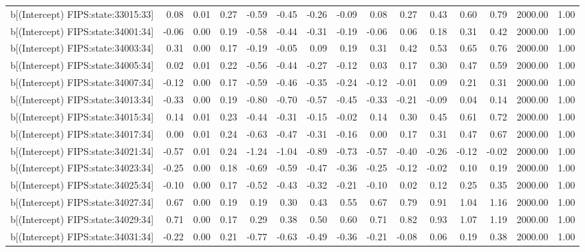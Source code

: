 \begin{table}[ht]
\begin{tabular}{rrrrrrrrrrrrrrr}
  b[(Intercept) FIPS:state:33015:33] & 0.08 & 0.01 & 0.27 & -0.59 & -0.45 & -0.26 & -0.09 & 0.08 & 0.27 & 0.43 & 0.60 & 0.79 & 2000.00 & 1.00 \\ 
  b[(Intercept) FIPS:state:34001:34] & -0.06 & 0.00 & 0.19 & -0.58 & -0.44 & -0.31 & -0.19 & -0.06 & 0.06 & 0.18 & 0.31 & 0.42 & 2000.00 & 1.00 \\ 
  b[(Intercept) FIPS:state:34003:34] & 0.31 & 0.00 & 0.17 & -0.19 & -0.05 & 0.09 & 0.19 & 0.31 & 0.42 & 0.53 & 0.65 & 0.76 & 2000.00 & 1.00 \\ 
  b[(Intercept) FIPS:state:34005:34] & 0.02 & 0.01 & 0.22 & -0.56 & -0.44 & -0.27 & -0.12 & 0.03 & 0.17 & 0.30 & 0.47 & 0.59 & 2000.00 & 1.00 \\ 
  b[(Intercept) FIPS:state:34007:34] & -0.12 & 0.00 & 0.17 & -0.59 & -0.46 & -0.35 & -0.24 & -0.12 & -0.01 & 0.09 & 0.21 & 0.31 & 2000.00 & 1.00 \\ 
  b[(Intercept) FIPS:state:34013:34] & -0.33 & 0.00 & 0.19 & -0.80 & -0.70 & -0.57 & -0.45 & -0.33 & -0.21 & -0.09 & 0.04 & 0.14 & 2000.00 & 1.00 \\ 
  b[(Intercept) FIPS:state:34015:34] & 0.14 & 0.01 & 0.23 & -0.44 & -0.31 & -0.15 & -0.02 & 0.14 & 0.30 & 0.45 & 0.61 & 0.72 & 2000.00 & 1.00 \\ 
  b[(Intercept) FIPS:state:34017:34] & 0.00 & 0.01 & 0.24 & -0.63 & -0.47 & -0.31 & -0.16 & 0.00 & 0.17 & 0.31 & 0.47 & 0.67 & 2000.00 & 1.00 \\ 
  b[(Intercept) FIPS:state:34021:34] & -0.57 & 0.01 & 0.24 & -1.24 & -1.04 & -0.89 & -0.73 & -0.57 & -0.40 & -0.26 & -0.12 & -0.02 & 2000.00 & 1.00 \\ 
  b[(Intercept) FIPS:state:34023:34] & -0.25 & 0.00 & 0.18 & -0.69 & -0.59 & -0.47 & -0.36 & -0.25 & -0.12 & -0.02 & 0.10 & 0.19 & 2000.00 & 1.00 \\ 
  b[(Intercept) FIPS:state:34025:34] & -0.10 & 0.00 & 0.17 & -0.52 & -0.43 & -0.32 & -0.21 & -0.10 & 0.02 & 0.12 & 0.25 & 0.35 & 2000.00 & 1.00 \\ 
  b[(Intercept) FIPS:state:34027:34] & 0.67 & 0.00 & 0.19 & 0.19 & 0.30 & 0.43 & 0.55 & 0.67 & 0.79 & 0.91 & 1.04 & 1.16 & 2000.00 & 1.00 \\ 
  b[(Intercept) FIPS:state:34029:34] & 0.71 & 0.00 & 0.17 & 0.29 & 0.38 & 0.50 & 0.60 & 0.71 & 0.82 & 0.93 & 1.07 & 1.19 & 2000.00 & 1.00 \\ 
  b[(Intercept) FIPS:state:34031:34] & -0.22 & 0.00 & 0.21 & -0.77 & -0.63 & -0.49 & -0.36 & -0.21 & -0.08 & 0.06 & 0.19 & 0.38 & 2000.00 & 1.00 \\ 

\end{tabular}
\end{table}
